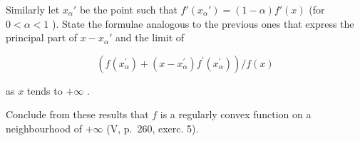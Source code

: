 Similarly let \(x_{\alpha}'\) be the point such that \(f'(x_{\alpha}') = (1 - \alpha)f'(x)\) (for \(0 < \alpha < 1\) ). State the formulae analogous to the previous ones that express the principal part of \(x - x_{\alpha}'\) and the limit of

\[
\left(f (x _ {\alpha} ^ {\prime}) + (x - x _ {\alpha} ^ {\prime}) f ^ {\prime} (x _ {\alpha} ^ {\prime})\right) / f (x)
\]

as \(x\) tends to \(+\infty\) .

Conclude from these results that \(f\) is a regularly convex function on a neighbourhood of \(+\infty\) (V, p.~260, exerc. 5).

\makeatletter
\gdef\@chapapp{\chaptername}
\makeatother
\renewcommand{\thechapter}{\Roman{chapter}}
\renewcommand{\thesection}{\S\arabic{section}}
\setcounter{chapter}{5}
